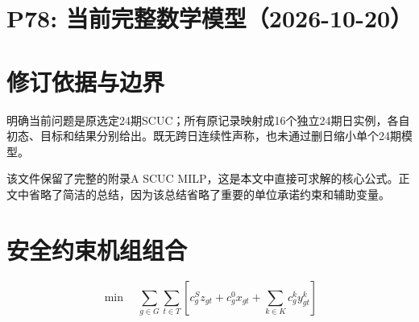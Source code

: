 \documentclass[11pt]{ctexart}
\begin{document}
\section*{P78: 当前完整数学模型（2026-10-20）}
\section*{修订依据与边界}明确当前问题是原选定24期SCUC；所有原记录映射成16个独立24期日实例，各自初态、目标和结果分别给出。既无跨日连续性声称，也未通过删日缩小单个24期模型。




该文件保留了完整的附录A SCUC MILP，这是本文中直接可求解的核心公式。正文中省略了简洁的总结，因为该总结省略了重要的单位承诺约束和辅助变量。

\section{安全约束机组组合}

\begin{equation}
\min \quad \sum_{g\in G} \sum_{t\in T} \left[c_g^S z_{gt} + c_g^0 x_{gt} + \sum_{k\in K} c_g^k y_{gt}^k\right]
\tag{11}
\end{equation}
\end{document}
